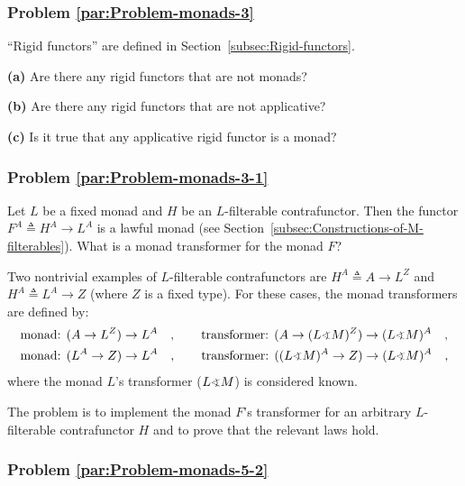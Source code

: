 \subsubsection{Problem \label{par:Problem-monads-3}\ref{par:Problem-monads-3}}

\textsf{``}Rigid functors\textsf{''} are defined
in Section~\ref{subsec:Rigid-functors}.

\textbf{(a)} Are there any rigid functors that are not monads? 

\textbf{(b)} Are there any rigid functors that are not applicative?

\textbf{(c)} Is it true that any applicative rigid functor is a monad?

\subsubsection{Problem \label{par:Problem-monads-3-1}\ref{par:Problem-monads-3-1}}

Let $L$ be a fixed monad and $H$ be an $L$-filterable contrafunctor.
Then the functor $F^{A}\triangleq H^{A}\rightarrow L^{A}$ is a lawful
monad (see Section~\ref{subsec:Constructions-of-M-filterables}).
What is a monad transformer for the monad $F$? 

Two nontrivial examples of $L$-filterable contrafunctors are $H^{A}\triangleq A\rightarrow L^{Z}$
and $H^{A}\triangleq L^{A}\rightarrow Z$ (where $Z$ is a fixed type).
For these cases, the monad transformers are defined by:
\begin{align*}
 & \text{monad: }(A\rightarrow L^{Z})\rightarrow L^{A}\quad,\quad\quad\text{transformer: }(A\rightarrow(L\varangle M)^{Z})\rightarrow(L\varangle M)^{A}\quad,\\
 & \text{monad: }(L^{A}\rightarrow Z)\rightarrow L^{A}\quad,\quad\quad\text{transformer: }((L\varangle M)^{A}\rightarrow Z)\rightarrow(L\varangle M)^{A}\quad,
\end{align*}
where the monad $L$\textsf{'}s transformer ($L\varangle M$) is considered
known.

The problem is to implement the monad $F$\textsf{'}s transformer for an arbitrary
$L$-filterable contrafunctor $H$ and to prove that the relevant
laws hold.

\subsubsection{Problem \label{par:Problem-monads-5-2}\ref{par:Problem-monads-5-2}}

